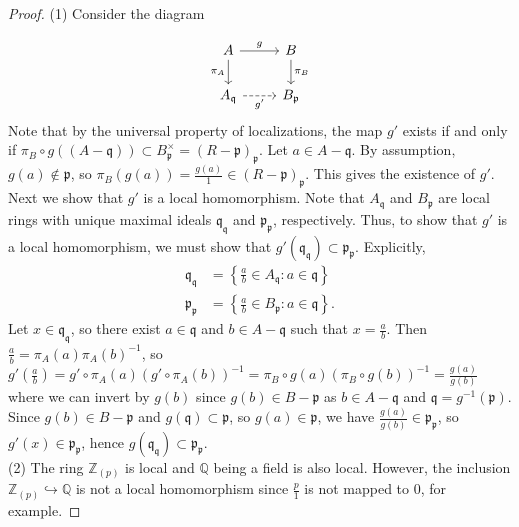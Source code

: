 \documentclass[reqno]{amsart}
\theoremstyle{definition}
\theoremstyle{remark}
\begin{document}
\begin{proof}
    (1) Consider the diagram

    \begin{equation*}
    \begin{tikzcd}
        A \ar[d, "\pi_A"'] \ar[r, "g"] & B \ar[d, "\pi_B"] \\
        A_{\mathfrak{q}} \ar[r, "g'"', dashed] & B_{\mathfrak{p}}
    \end{tikzcd}
    \end{equation*}
    Note that
    by the universal property of localizations, 
    the map $g'$ exists if and only if
    $\pi_B \circ g \left( \left( A- \mathfrak{q} \right) 
    \right) \subset 
    B_{\mathfrak{p}}^{\times }
    = \left( R - \mathfrak{p} \right)_{\mathfrak{p}}$.
    Let 
    $a \in A - \mathfrak{q}$. By assumption, 
    $g (a) \not\in \mathfrak{p}$, so
    $\pi_B \left( g (a) \right) = \frac{g(a)}{1}
    \in \left( R - \mathfrak{p} \right)_{\mathfrak{p}} $.
    This gives the existence of $g'$.\\
    Next we show that
    $g'$ is a local homomorphism. 
    Note that $A_{\mathfrak{q}}$ and
    $B_{\mathfrak{p}}$ are local rings
    with unique maximal ideals
    $\mathfrak{q}_{\mathfrak{q}}$ and
    $\mathfrak{p}_{\mathfrak{p}}$, respectively. Thus, to
    show that $g'$ is a local homomorphism, we must show
    that $g' \left( \mathfrak{q}_{\mathfrak{q}} \right) 
    \subset \mathfrak{p}_{\mathfrak{p}}$.
    Explicitly, 
    \begin{align*}
        \mathfrak{q}_{\mathfrak{q}} &=
        \left\{ \frac{a}{b} \in A_{\mathfrak{q}} \colon
        a \in \mathfrak{q} \right\} \\
        \mathfrak{p}_{\mathfrak{p} } &=
        \left\{ \frac{a}{b} \in B_{\mathfrak{p}} \colon
        a \in \mathfrak{q} \right\} .
    \end{align*}
    Let $x \in 
    \mathfrak{q}_{\mathfrak{q}}$, so
    there exist $a \in \mathfrak{q}$ and
    $b \in A - \mathfrak{q}$ such that
    $x = \frac{a}{b}$.
    Then
    $\frac{a}{b} = \pi_A (a) \pi_A(b)^{-1}$, so
    $g' \left( \frac{a}{b} \right) 
    = g' \circ \pi_A (a) 
    \left( g' \circ \pi_A (b) \right)^{-1}
    = \pi_B \circ g(a) \left( \pi_B \circ g(b) \right)^{-1}
    = \frac{g(a)}{g(b)}$ where
    we can invert by $g(b)$ since
    $g(b) \in B - \mathfrak{p}$ as
    $b \in A - \mathfrak{q}$ and
    $\mathfrak{q} = g^{-1}\left( \mathfrak{p} \right) $.
    Since $g(b) \in B - \mathfrak{p}$ and
    $g\left( \mathfrak{q} \right) 
    \subset \mathfrak{p}$, 
    so $g(a) \in \mathfrak{p}$, we have
    $\frac{g(a)}{g(b)} \in 
    \mathfrak{p}_{\mathfrak{p}}$, so
    $g'(x) \in \mathfrak{p}_{\mathfrak{p}}$, hence
    $g\left( \mathfrak{q}_{\mathfrak{q}} \right) 
    \subset \mathfrak{p}_{\mathfrak{p}}$.
    \\
    \linebreak
    (2) 
The ring $\mathbb{Z}_{(p)}$ is local and 
$\mathbb{Q}$ being a field is also local. However,
the inclusion  $\mathbb{Z}_{(p)} \hookrightarrow
\mathbb{Q}$ is not a local homomorphism since
$\frac{p}{1}$ is not mapped to $0$, for example.
\end{proof}












\end{document}
